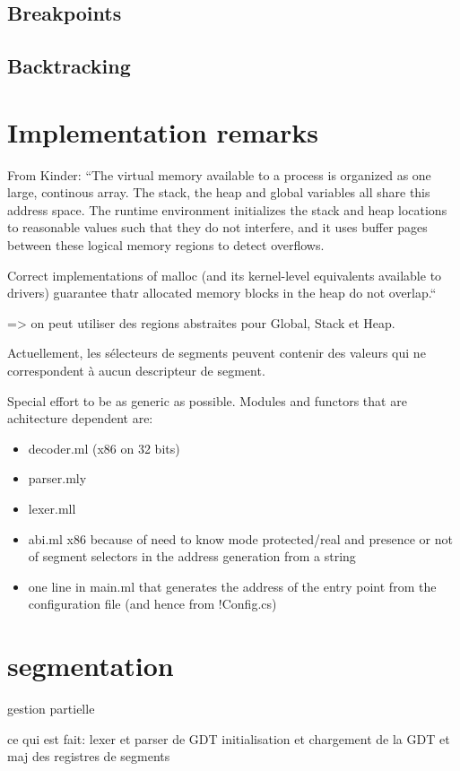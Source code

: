 \documentclass{report}
\begin{document}
\section{Breakpoints}
\section{Backtracking}

\chapter{Implementation remarks}

From Kinder:
``The virtual memory available to a process is organized as one large,
continous array. The stack, the heap and global variables all share
this address space. The runtime environment initializes the stack and
heap locations to reasonable values such that they do not interfere,
and it uses buffer pages between these logical memory regions to
detect overflows.

Correct implementations of malloc (and its kernel-level equivalents
available to drivers) guarantee thatr allocated memory blocks in the
heap do not overlap.``

=> on peut utiliser des regions abstraites pour Global, Stack et Heap.

Actuellement, les sélecteurs de segments peuvent contenir des valeurs
qui ne correspondent à aucun descripteur de segment.

Special effort to be as generic as possible.
Modules and functors that are achitecture dependent are:
\begin{itemize}
\item decoder.ml (x86 on 32 bits)
\item parser.mly
\item lexer.mll
\item abi.ml x86 because of need to know mode protected/real and
  presence or not of segment selectors in the address generation from
  a string
\item one line in main.ml that generates the address of the entry
  point from the configuration file (and hence from !Config.cs)
\end{itemize}

\chapter{segmentation}
gestion partielle

ce qui est fait:
lexer et parser de GDT
initialisation et chargement de la GDT et maj des registres de
segments
\end{document}
